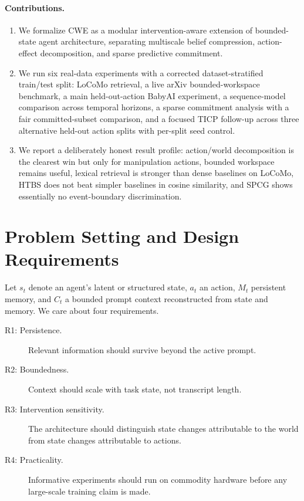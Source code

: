 \documentclass[11pt]{article}
\begin{document}
\paragraph{Contributions.}
\begin{enumerate}
    \item We formalize CWE as a modular intervention-aware extension of bounded-state agent architecture, separating multiscale belief compression, action-effect decomposition, and sparse predictive commitment.
    \item We run six real-data experiments with a corrected dataset-stratified train/test split: LoCoMo retrieval, a live arXiv bounded-workspace benchmark, a main held-out-action BabyAI experiment, a sequence-model comparison across temporal horizons, a sparse commitment analysis with a fair committed-subset comparison, and a focused TICP follow-up across three alternative held-out action splits with per-split seed control.
    \item We report a deliberately honest result profile: action/world decomposition is the clearest win but only for manipulation actions, bounded workspace remains useful, lexical retrieval is stronger than dense baselines on LoCoMo, HTBS does not beat simpler baselines in cosine similarity, and SPCG shows essentially no event-boundary discrimination.
\end{enumerate}

\section{Problem Setting and Design Requirements}
Let $s_t$ denote an agent's latent or structured state, $a_t$ an action, $M_t$ persistent memory, and $C_t$ a bounded prompt context reconstructed from state and memory. We care about four requirements.
\begin{description}
    \item[R1: Persistence.] Relevant information should survive beyond the active prompt.
    \item[R2: Boundedness.] Context should scale with task state, not transcript length.
    \item[R3: Intervention sensitivity.] The architecture should distinguish state changes attributable to the world from state changes attributable to actions.
    \item[R4: Practicality.] Informative experiments should run on commodity hardware before any large-scale training claim is made.
\end{description}
\end{document}
